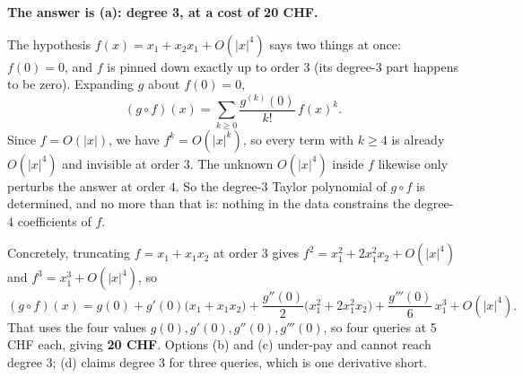 \begin{exercisesolution}
\label{sol:taylor_expansion_cost_multiple_choice}
\textbf{The answer is (a): degree 3, at a cost of 20 CHF.}

The hypothesis $f(x) = x_1 + x_2x_1 + O(|x|^4)$ says two things at once: $f(0) = 0$, and $f$ is
pinned down exactly up to order $3$ (its degree-$3$ part happens to be zero). Expanding $g$ about
$f(0) = 0$,
\[(g\circ f)(x) = \sum_{k \geq 0} \frac{g^{(k)}(0)}{k!}\,f(x)^k.\]
Since $f = O(|x|)$, we have $f^k = O(|x|^k)$, so every term with $k \geq 4$ is already
$O(|x|^4)$ and invisible at order $3$. The unknown $O(|x|^4)$ inside $f$ likewise only perturbs
the answer at order $4$. So the degree-$3$ Taylor polynomial of $g \circ f$ is determined, and no
more than that is: nothing in the data constrains the degree-$4$ coefficients of $f$.

Concretely, truncating $f = x_1 + x_1x_2$ at order $3$ gives $f^2 = x_1^2 + 2x_1^2x_2 + O(|x|^4)$
and $f^3 = x_1^3 + O(|x|^4)$, so
\[(g\circ f)(x) = g(0) + g'(0)\big(x_1 + x_1x_2\big)
  + \frac{g''(0)}{2}\big(x_1^2 + 2x_1^2x_2\big) + \frac{g'''(0)}{6}\,x_1^3 + O(|x|^4).\]
That uses the four values $g(0), g'(0), g''(0), g'''(0)$, so four queries at 5 CHF each, giving
\textbf{20 CHF}. Options (b) and (c) under-pay and cannot reach degree 3; (d) claims degree 3 for
three queries, which is one derivative short.
\end{exercisesolution}

